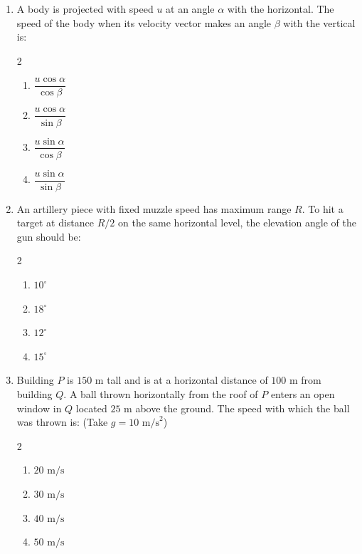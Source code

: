 \documentclass[11pt,a4paper]{article}
\begin{document}
\begin{enumerate}[label=\textbf{\textcolor{l2Amber}{Q\arabic*.}},leftmargin=24pt,itemsep=10pt,start=26]
  \item A body is projected with speed $u$ at an angle $\alpha$ with the horizontal. The speed of the body when its velocity vector makes an angle $\beta$ with the vertical is:
  \begin{multicols}{2}
  \begin{enumerate}[label=\textbf{\textcolor{primaryDark}{(\Alph*)}},itemsep=2pt]
    \item $\dfrac{u\cos\alpha}{\cos\beta}$
    \item $\dfrac{u\cos\alpha}{\sin\beta}$
    \item $\dfrac{u\sin\alpha}{\cos\beta}$
    \item $\dfrac{u\sin\alpha}{\sin\beta}$
  \end{enumerate}
  \end{multicols}

  \item An artillery piece with fixed muzzle speed has maximum range $R$. To hit a target at distance $R/2$ on the same horizontal level, the elevation angle of the gun should be:
  \begin{multicols}{2}
  \begin{enumerate}[label=\textbf{\textcolor{primaryDark}{(\Alph*)}},itemsep=2pt]
    \item $10^\circ$
    \item $18^\circ$
    \item $12^\circ$
    \item $15^\circ$
  \end{enumerate}
  \end{multicols}

  \item Building $P$ is $150\text{ m}$ tall and is at a horizontal distance of $100\text{ m}$ from building $Q$. A ball thrown horizontally from the roof of $P$ enters an open window in $Q$ located $25\text{ m}$ above the ground. The speed with which the ball was thrown is: (Take $g = 10\text{ m/s}^2$)
  \begin{multicols}{2}
  \begin{enumerate}[label=\textbf{\textcolor{primaryDark}{(\Alph*)}},itemsep=2pt]
    \item $20\text{ m/s}$
    \item $30\text{ m/s}$
    \item $40\text{ m/s}$
    \item $50\text{ m/s}$
  \end{enumerate}
  \end{multicols}


\end{enumerate}
\end{document}
